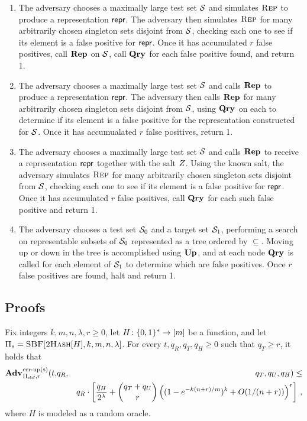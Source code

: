 \begin{enumerate}
 \item The adversary chooses a maximally large test set $\mathcal{S}$ and simulates $\textsc{Rep}$ to produce a representation $\mathsf{repr}$. The adversary then simulates $\textsc{Rep}$ for many arbitrarily chosen singleton sets disjoint from $\mathcal{S}$, checking each one to see if its element is a false positive for $\mathsf{repr}$. Once it has accumulated $r$ false positives, call $\mathbf{Rep}\hspace{0.5pt}$ on $\mathcal{S}$, call $\mathbf{Qry}\hspace{0.5pt}$ for each false positive found, and return 1.
 \item The adversary chooses a maximally large test set $\mathcal{S}$ and calls $\mathbf{Rep}\hspace{0.5pt}$ to produce a representation $\mathsf{repr}$. The adversary then calls $\mathbf{Rep}\hspace{0.5pt}$ for many arbitrarily chosen singleton sets disjoint from $\mathcal{S}$, using $\mathbf{Qry}\hspace{0.5pt}$ on each to determine if its element is a false positive for the representation constructed for $\mathcal{S}$. Once it has accumualated $r$ false positives, return 1.
 \item The adversary chooses a maximally large test set $\mathcal{S}$ and calls $\mathbf{Rep}\hspace{0.5pt}$ to receive a representation $\mathsf{repr}$ together with the salt $Z$. Using the known salt, the adversary simulates $\textsc{Rep}$ for many arbitrarily chosen singleton sets disjoint from $\mathcal{S}$, checking each one to see if its element is a false positive for $\mathsf{repr}$. Once it has accumulated $r$ false positives, call $\mathbf{Qry}\hspace{0.5pt}$ for each such false positive and return 1.
 \item The adversary chooses a test set $\mathcal{S}_0$ and a target set $\mathcal{S}_1$, performing a search on representable subsets of $\mathcal{S}_0$ represented as a tree ordered by $\subseteq$. Moving up or down in the tree is accomplished using $\mathbf{Up}\hspace{0.5pt}$, and at each node $\mathbf{Qry}\hspace{0.5pt}$ is called for each element of $\mathcal{S}_1$ to determine which are false positives. Once $r$ false positives are found, halt and return 1.
\end{enumerate}

\subsection{Proofs}

\begin{theorem}\label{thm:bf-priv-salt-bound}
Fix integers $k, m, n, \lambda, r\geq 0$, let $H \colon \{0,1\}^* \to [m]$ be a function, and let $\mathrm{\Pi}_s = \textsc{SBF}[\textsc{2Hash}[H],k,m,n,\lambda]$.
  For every $t, q_R, q_T, q_H \geq 0$ such that $q_T \geq r$, it holds that
  \begin{eqnarray*}
    \Adv{\erreps}_{\struct_\saltybloom,r}(t,&q_R,& q_T, q_U, q_H) \leq \\ && q_R \cdot
     \left[
      \frac{q_H}{2^\lambda} +
      {\dbinom{q_T+q_U}{r}} \left( (1-e^{-k(n+r)/m})^k + O(1/(n+r)) \right)^r
    \right] \,,
\end{eqnarray*}
where $H$ is modeled as a random oracle.
\end{theorem}


